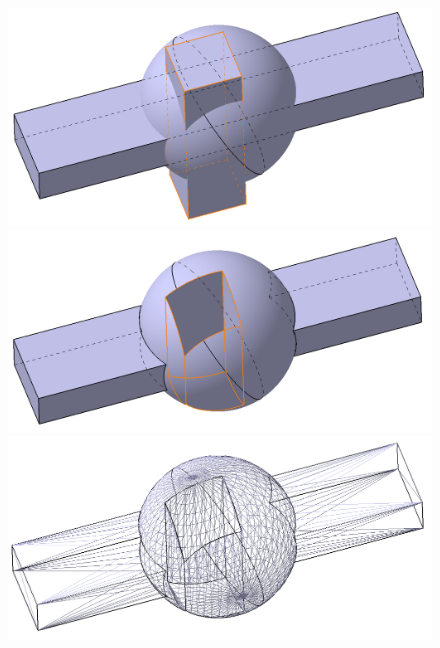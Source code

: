 \begin{figure}[H]
\begin{minipage}[b]{0.495\textwidth}
\includegraphics[width=1.0\textwidth]{pictures/Separate_primitives.png}
\end{minipage}
\hspace{0.01\textwidth}
\begin{minipage}[b]{0.495\textwidth}
\includegraphics[width=1.0\textwidth]{pictures/BREP_2.png}
\end{minipage}
\begin{minipage}[b]{0.495\textwidth}
\includegraphics[width=1.0\textwidth]{pictures/Triangles.png}
\end{minipage}

\end{figure}
